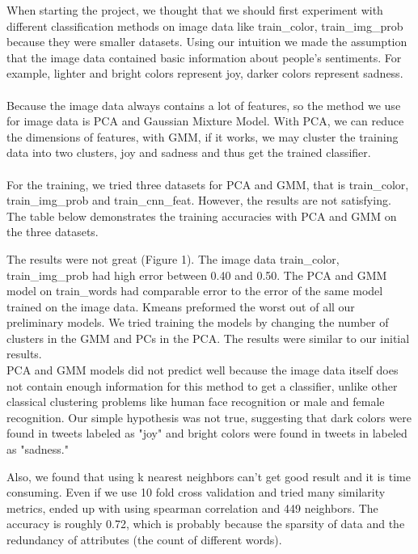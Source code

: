 \documentclass[]{article}
\begin{document}
When starting the project, we thought that we should first experiment with different classification methods on image data like train\_color, train\_img\_prob because they were smaller datasets. Using our intuition we made the assumption that the image data contained basic information about people's sentiments. For example, lighter and bright colors represent joy, darker colors represent sadness. \\\\

Because the image data always contains a lot of features, so the method we use for image data is PCA and Gaussian Mixture Model. With PCA, we can reduce the dimensions of features, with GMM, if it works, we may cluster the training data into two clusters, joy and sadness and thus get the trained classifier. \\\\

For the training, we tried three datasets for PCA and GMM, that is train\_color, train\_img\_prob and train\_cnn\_feat. However, the results are not satisfying. The table below demonstrates the training accuracies with PCA and GMM on the three datasets.


The results were not great (Figure 1). The image data train\_color, train\_img\_prob had high error between 0.40 and 0.50. The PCA and GMM model on train\_words had comparable error to the error of the same model trained on the image data. Kmeans preformed the worst out of all our preliminary models. We tried training the models by changing the number of clusters in the GMM and PCs in the PCA. The results were similar to our initial results. \\


PCA and GMM models did not predict well because the image data itself does not contain enough information for this method to get a classifier, unlike other classical clustering problems like human face recognition or male and female recognition. Our simple hypothesis was not true, suggesting that dark colors were found in tweets labeled as "joy" and bright colors were found in tweets in labeled as "sadness." 

Also, we found that using k nearest neighbors can't get good result and it is time consuming. Even if we use 10 fold cross validation and tried many similarity metrics, ended up with using spearman correlation and 449 neighbors. The accuracy is roughly 0.72, which is probably because the sparsity of data and the redundancy of attributes (the count of different words).
\end{document}
